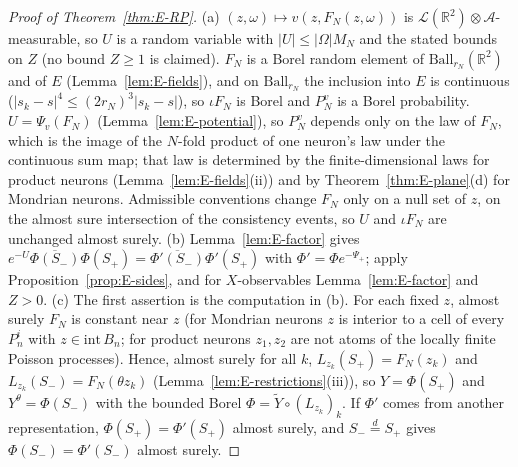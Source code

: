\documentclass[11pt]{article}
\theoremstyle{plain}
\theoremstyle{definition}
\theoremstyle{remark}
\newcommand{\R}{\mathbb{R}}
\newcommand{\cL}{\mathcal{L}}
\newcommand{\cA}{\mathcal{A}}
\newcommand{\Ball}{\mathrm{Ball}}
\newcommand{\conj}[1]{\overline{#1}}
\begin{document}
\begin{proof}[Proof of Theorem~\ref{thm:E-RP}]
(a) $(z,\omega)\mapsto v(z,F_N(z,\omega))$ is $\cL(\R^{2})\otimes\cA$-measurable, so $U$ is a random
variable with $|U|\le|\Omega|M_N$ and the stated bounds on $Z$ (no bound $Z\ge1$ is claimed).
$F_N$ is a Borel random element of $\Ball_{r_N}(\R^{2})$ and of $E$ (Lemma~\ref{lem:E-fields}), and
on $\Ball_{r_N}$ the inclusion into $E$ is continuous ($|s_k-s|^{4}\le(2r_N)^{3}|s_k-s|$), so $\iota F_N$ is
Borel and $P^{v}_{N}$ is a Borel probability. $U=\Psi_v(F_N)$ (Lemma~\ref{lem:E-potential}), so
$P^{v}_{N}$ depends only on the law of $F_N$, which is the image of the $N$-fold product
of one neuron's law under the continuous sum map; that law is determined by the
finite-dimensional laws for product neurons (Lemma~\ref{lem:E-fields}(ii)) and by
Theorem~\ref{thm:E-plane}(d) for Mondrian neurons. Admissible conventions change
$F_N$ only on a null set of $z$, on the almost sure intersection of the consistency
events, so $U$ and $\iota F_N$ are unchanged almost surely.
(b) Lemma~\ref{lem:E-factor} gives $e^{-U}\conj{\Phi(S_-)}\Phi(S_+)=\conj{\Phi'(S_-)}\Phi'(S_+)$ with
$\Phi'=\Phi e^{-\Psi_+}$; apply Proposition~\ref{prop:E-sides}, and for $X$-observables
Lemma~\ref{lem:E-factor} and $Z>0$.
(c) The first assertion is the computation in (b). For each fixed $z$, almost surely
$F_N$ is constant near $z$ (for Mondrian neurons $z$ is interior to a cell of every $P^{i}_{n}$
with $z\in\mathrm{int}\,B_n$; for product neurons $z_1,z_2$ are not atoms of the locally finite
Poisson processes). Hence, almost surely for all $k$, $L_{z_k}(S_+)=F_N(z_k)$ and
$L_{z_k}(S_-)=F_N(\theta z_k)$ (Lemma~\ref{lem:E-restrictions}(iii)), so $Y=\Phi(S_+)$ and
$Y^{\theta}=\Phi(S_-)$ with the bounded Borel $\Phi=\tilde Y\circ(L_{z_k})_k$. If $\Phi'$ comes from another
representation, $\Phi(S_+)=\Phi'(S_+)$ almost surely, and $S_-\overset{d}{=}S_+$ gives $\Phi(S_-)=\Phi'(S_-)$
almost surely.
\end{proof}
\end{document}
